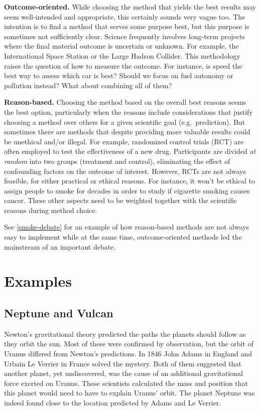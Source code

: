 \documentclass[
]{book}
\begin{document}
\textbf{Outcome-oriented.} While choosing the method that yields the best results may seem well-intended and appropriate, this certainly sounds very vague too. The intention is to find a method that serves some purpose best, but this purpose is sometimes not sufficiently clear. Science frequently involves long-term projects where the final material outcome is uncertain or unknown. For example, the International Space Station or the Large Hadron Collider. This methodology raises the question of how to measure the outcome. For instance, is speed the best way to assess which car is best? Should we focus on fuel autonomy or pollution instead? What about combining all of them?

\textbf{Reason-based.} Choosing the method based on the overall best reasons seems the best option, particularly when the reasons include considerations that justify choosing a method over others for a given scientific goal (e.g.~prediction). But sometimes there are methods that despite providing more valuable results could be unethical and/or illegal. For example, randomized control trials (RCT) are often employed to test the effectiveness of a new drug. Participants are divided \emph{at random} into two groups (treatment and control), eliminating the effect of confounding factors on the outcome of interest. However, RCTs are not always feasible, for either practical or ethical reasons. For instance, it won't be ethical to assign people to smoke for decades in order to study if cigarette smoking causes cancer. These other aspects need to be weighted together with the scientific reasons during method choice.

See \ref{smoke-debate} for an example of how reason-based methods are not always easy to implement while at the same time, outcome-oriented methods led the mainstream of an important debate.

\newpage

\hypertarget{examples}{%
\section{Examples}\label{examples}}

\hypertarget{neptune-vulcan}{%
\subsection{Neptune and Vulcan}\label{neptune-vulcan}}

Newton's gravitational theory predicted the paths the planets should follow as they orbit the sun. Most of these were confirmed by observation, but the orbit of Uranus differed from Newton's predictions. In 1846 John Adams in England and Urbain Le Verrier in France solved the mystery. Both of them suggested that another planet, yet undiscovered, was the cause of an additional gravitational force exerted on Uranus. These scientists calculated the mass and position that this planet would need to have to explain Uranus' orbit. The planet Neptune was indeed found close to the location predicted by Adams and Le Verrier.
\end{document}
